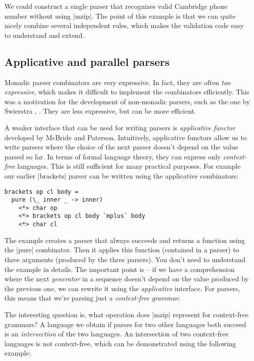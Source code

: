 \documentclass{tmr}
\begin{document}
We could construct a single parser that recognizes valid Cambridge phone number without using
|mzip|. The point of this example is that we can quite nicely combine several independent rules,
which makes the validation code easy to understand and extend.


\subsection{Applicative and parallel parsers}

Monadic parser combinators are very expressive. In fact, they are often \textit{too expressive}, 
which makes it difficult to implement the combinators efficiently. This was a motivation for
the development of non-monadic parsers, such as the one by Swierstra \cite{deterparser}, 
\cite{parsingtutorial}. They are less expressive, but can be more efficient.  

A weaker interface that can be used for writing parsers is \textit{applicative functor}
\cite{applicative} developed by McBride and Paterson. Intuitively, applicative functors allow
us to write parsers where the choice of the next parser doesn't depend on the value parsed 
so far. In terms of formal language theory, they can express only \textit{context-free} languages.
This is still sufficient for many practical purposes. For example our earlier |brackets| parser
can be written using the applicative combinators:

\begin{verbatim}
brackets op cl body = 
  pure (\_ inner _ -> inner)
    <*> char op
    <*> brackets op cl body `mplus` body
    <*> char cl
\end{verbatim}
The example creates a parser that always succeeds and returns a function using the |pure| 
combinator. Then it applies this function (contained in a parser) to three arguments (produced
by the three parsers). You don't need to understand the example in details. The important
point is -- if we have a comprehension where the next \textit{generator} in a sequence
doesn't depend on the value produced by the previous one, we can rewrite it using the 
\textit{applicative} interface. For parsers, this means that we're parsing just a 
\textit{context-free grammar}.

The interesting question is, what operation does |mzip| represent for context-free grammars?
A language we obtain if parses for two other languages both succeed is an \textit{intersection} 
of the two languages. An intersection of two context-free languages is not context-free, which
can be demonstrated using the following example:
\end{document}
